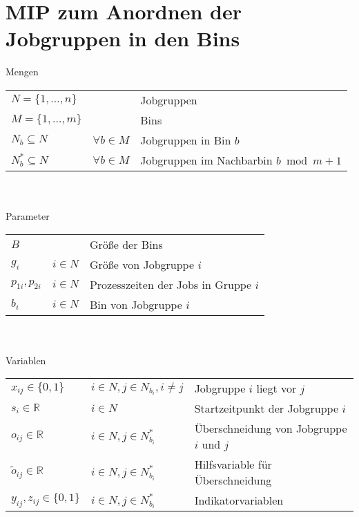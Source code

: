 \documentclass{article}
\begin{document}
\section*{MIP zum Anordnen der Jobgruppen in den Bins}
Mengen\\
\begin{tabular}{lll}
    $N=\{1,\dots,n\}$ & & Jobgruppen\\
    $M=\{1,\dots,m\}$ & & Bins\\
    $N_b\subseteq N$ & $\forall b\in M$ & Jobgruppen in Bin $b$\\
    $N_b^*\subseteq N$ & $\forall b\in M$ & Jobgruppen im Nachbarbin $b\bmod m+1$
\end{tabular}%
\\
\\
Parameter\\
\begin{tabular}{lll}
    $B$ & & Größe der Bins\\
    $g_i$ & $i\in N$ & Größe von Jobgruppe $i$\\
    $p_{1i},p_{2i}$ & $i\in N$ & Prozesszeiten der Jobs in Gruppe $i$\\
    $b_i$ & $i\in N$ & Bin von Jobgruppe $i$
\end{tabular}%
\\
\\
Variablen\\
\begin{tabular}{lll}
    $x_{ij}\in\{0,1\}$ & $i\in N,j\in N_{b_i}, i\neq j$ &
            Jobgruppe $i$ liegt vor $j$\\
    $s_i\in\mathbb{R}$ & $i\in N$ & Startzeitpunkt der Jobgruppe $i$\\
    $o_{ij}\in\mathbb{R}$ & $i\in N,j\in N_{b_i}^*$ &
            Überschneidung von Jobgruppe $i$ und $j$ \\
    $\tilde{o}_{ij}\in\mathbb{R}$ & $i\in N,j\in N_{b_i}^*$ &
            Hilfsvariable für Überschneidung \\
    $y_{ij},z_{ij}\in\{0,1\}$ & $i\in N,j\in N_{b_i}^*$ & Indikatorvariablen
\end{tabular}
\\
\\
\\
%
\end{document}
